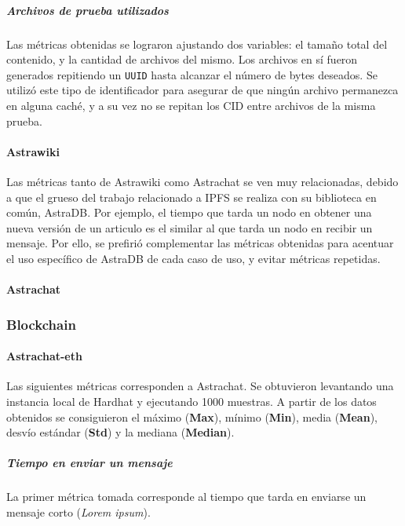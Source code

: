 \subparagraph{Archivos de prueba utilizados} Las métricas obtenidas se lograron ajustando dos variables: el tamaño total del contenido, y la cantidad de archivos del mismo. Los archivos en sí fueron generados repitiendo un \texttt{UUID} hasta alcanzar el número de bytes deseados. Se utilizó este tipo de identificador para asegurar de que ningún archivo permanezca en alguna caché, y a su vez no se repitan los CID entre archivos de la misma prueba.


\paragraph{Astrawiki}

Las métricas tanto de Astrawiki como Astrachat se ven muy relacionadas, debido a que el grueso del trabajo relacionado a IPFS se realiza con su biblioteca en común, AstraDB. Por ejemplo, el tiempo que tarda un nodo en obtener una nueva versión de un articulo es el similar al que tarda un nodo en recibir un mensaje. Por ello, se prefirió complementar las métricas obtenidas para acentuar el uso específico de AstraDB de cada caso de uso, y evitar métricas repetidas. 

\paragraph{Astrachat}

\subsubsection{Blockchain}

\paragraph{Astrachat-eth}

Las siguientes métricas corresponden a Astrachat. Se obtuvieron levantando una instancia local de Hardhat \cite{hardhat} y ejecutando 1000 muestras. A partir de los datos obtenidos se consiguieron el máximo (\textbf{Max}), mínimo (\textbf{Min}), media (\textbf{Mean}), desvío estándar (\textbf{Std}) y la mediana (\textbf{Median}).

\subparagraph{Tiempo en enviar un mensaje}

La primer métrica tomada corresponde al tiempo que tarda en enviarse un mensaje corto (\textit{Lorem ipsum}).

